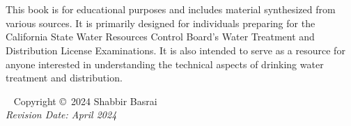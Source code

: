 \documentclass[11pt,fleqn]{book} %
\begin{document}

\newpage
~\vfill
\thispagestyle{empty}

\newpage
~\vfill
\thispagestyle{empty}

%
%

This book is for educational purposes and includes material synthesized from various sources.  It is primarily designed for individuals preparing for the California State Water Resources Control Board's Water Treatment and Distribution License Examinations. It is also intended to serve as a resource for anyone interested in understanding the technical aspects of drinking water treatment and distribution.

~\vfill
\noindent Copyright \copyright\ 2024 Shabbir Basrai\\ %
\noindent \textit{Revision Date: April 2024} %




\pagestyle{empty} %

\tableofcontents %
\listoffigures
\listoftables
\cleardoublepage %

\pagestyle{fancy} %

\end{document}
